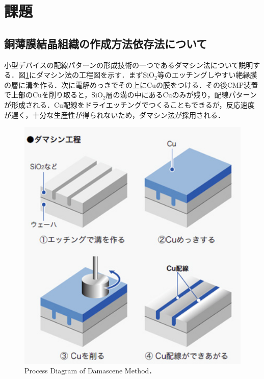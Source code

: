\section{課題}

\subsection{銅薄膜結晶組織の作成方法依存法について}
小型デバイスの配線パターンの形成技術の一つであるダマシン法について説明する．図\ref{fig:ダマシン}にダマシン法の工程図を示す．まずSiO$_2$等のエッチングしやすい絶縁膜の層に溝を作る．次に電解めっきでその上にCuの膜をつける．その後CMP装置で上部のCuを削り取ると，SiO$_2$層の溝の中にあるCuのみが残り，配線パターンが形成される．Cu配線をドライエッチングでつくることもできるが，反応速度が遅く，十分な生産性が得られないため，ダマシン法が採用される．
\begin{figure}[htbp]
    \centering %
    \includegraphics[width=100truemm,clip]{fig/fig_ダマシン.png}
    \caption{Process Diagram of Damascene Method\cite{ダマシン}．}
    \label{fig:ダマシン}
\end{figure}
